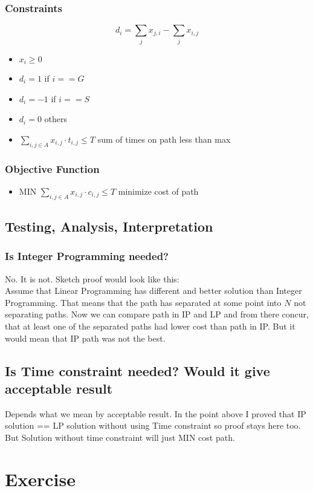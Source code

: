 \documentclass[11pt]{article}
\begin{document}
\subsubsection*{Constraints}
$$d_i = \sum_{j} x_{j,i} - \sum_{j} x_{i,j}$$
\begin{itemize}
    \item $x_i \geq 0$
    \item $d_i = 1$ if $i == G$
    \item $d_i = -1$ if $i == S$
    \item $d_i = 0$ others
    \item $\sum_{i,j \in A} x_{i,j} \cdot t_{i,j} \leq T$  sum of times on path less than max
\end{itemize}
\subsubsection*{Objective Function}
\begin{itemize}
    \item MIN $\sum_{i,j \in A} x_{i,j} \cdot c_{i,j} \leq T$  minimize cost of path
\end{itemize}
\subsection{Testing, Analysis, Interpretation}

\subsubsection*{Is Integer Programming needed?}
No. It is not. Sketch proof would look like this: \\
Assume that Linear Programming has different and better solution than Integer Programming.
That means that the path has separated at some point into $N$ not separating paths.
Now we can compare path in IP and LP and from there concur, that at least one of the separated paths had lower cost than path in IP.
But it would mean that IP path was not the best.
\subsection*{Is Time constraint needed? Would it give acceptable result}
Depends what we mean by acceptable result. In the point above I proved that IP solution == LP solution without using Time constraint so proof stays here too.
But Solution without time constraint will just MIN cost path. 

\section{Exercise}
\end{document}
